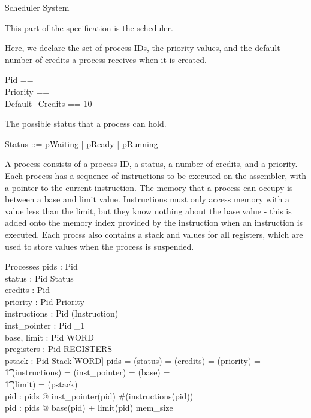 \documentclass{article}
\begin{document}
\begin{zsection}
  \SECTION Scheduler \parents System
\end{zsection}

This part of the specification is the scheduler.

Here, we declare the set of process IDs, the priority values, and the
default number of credits a process receives when it is created.

\begin{zed}
  Pid == \nat\\
  Priority ==  \\
  Default\_Credits == 10
\end{zed}

The possible status that a process can hold.

\begin{zed}
  Status ::= pWaiting | pReady | pRunning
\end{zed}

A process consists of a process ID, a status, a number of credits, and
a priority. Each process has a sequence of instructions to be executed
on the assembler, with a pointer to the current instruction. The
memory that a process can occupy is between a base and limit
value. Instructions must only access memory with a value less than the
limit, but they know nothing about the base value - this is added onto
the memory index provided by the instruction when an instruction is
executed. Each procss also contains a stack and values for all
registers, which are used to store values when the process is
suspended.

\begin{schema}{Processes}
  pids : \power Pid\\
  status : Pid \pfun Status\\
  credits : Pid \pfun \nat\\
  priority : Pid \pfun Priority\\
  instructions : Pid \pfun (\seq Instruction)\\
  inst\_pointer : Pid \pfun \nat_1\\
  base, limit : Pid \pfun WORD\\
  pregisters : Pid \pfun REGISTERS\\
  pstack : Pid \pfun Stack[WORD]
\where
  pids = \dom(status) = \dom(credits) = \dom(priority) =\\
    \t1 \dom(instructions) = \dom(inst\_pointer) = \dom(base) =\\
    \t1 \dom(limit) = \dom(pstack)\\
  \forall pid : pids @ inst\_pointer(pid) \leq \#(instructions(pid))\\
  \forall pid : pids @ base(pid) + limit(pid) \leq mem\_size
\end{schema}
\end{document}
